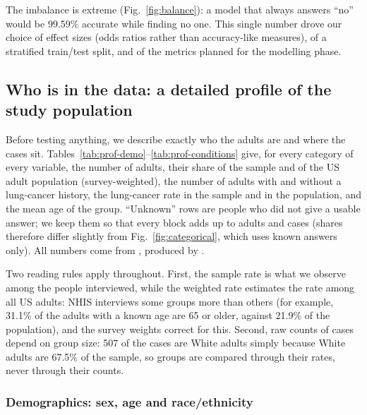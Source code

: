 The imbalance is extreme (Fig.~\ref{fig:balance}): a model that always answers ``no'' would be 99.59\% accurate while finding no one. This single number drove our choice of effect sizes (odds ratios rather than accuracy-like measures), of a stratified train/test split, and of the metrics planned for the modelling phase.

\subsection{Who is in the data: a detailed profile of the study population}\label{sec:profile}

Before testing anything, we describe exactly who the \nAdults adults are and where the \nCases cases sit. Tables~\ref{tab:prof-demo}--\ref{tab:prof-conditions} give, for every category of every variable, the number of adults, their share of the sample and of the US adult population (survey-weighted), the number of adults with and without a lung-cancer history, the lung-cancer rate in the sample and in the population, and the mean age of the group. ``Unknown'' rows are people who did not give a usable answer; we keep them so that every block adds up to \nAdults adults and \nCases cases (shares therefore differ slightly from Fig.~\ref{fig:categorical}, which uses known answers only). All numbers come from , produced by .

Two reading rules apply throughout. First, the sample rate is what we observe among the people interviewed, while the weighted rate estimates the rate among all US adults: NHIS interviews some groups more than others (for example, 31.1\% of the adults with a known age are 65 or older, against 21.9\% of the population), and the survey weights correct for this. Second, raw counts of cases depend on group size: 507 of the \nCases cases are White adults simply because White adults are 67.5\% of the sample, so groups are compared through their rates, never through their counts.

\subsubsection{Demographics: sex, age and race/ethnicity}\label{sec:demo}

\begin{table}[htbp]
\centering\footnotesize
\caption{Demographic profile of the \nAdults adults: adults, share of the sample and of the US adult population (weighted, wtd), adults with and without a lung-cancer history, lung-cancer rate and mean age, by sex, age group and race/ethnicity. AIAN = American Indian or Alaska Native.}\label{tab:prof-demo}

\end{table}

